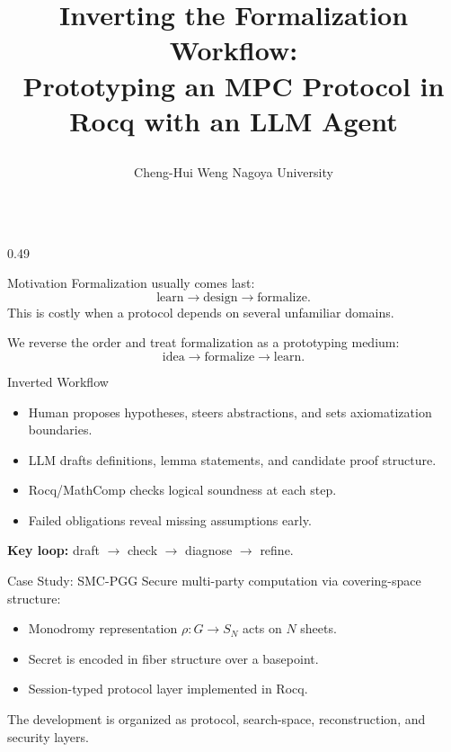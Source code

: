 \documentclass[final,t]{beamer}
\title{\parbox{0.93\linewidth}{\centering
Inverting the Formalization Workflow:\\[0.2em]
\Large Prototyping an MPC Protocol in Rocq with an LLM Agent}}
\author{Cheng-Hui Weng \quad Nagoya University}
\date{}
\newcommand{\kw}[1]{\textbf{#1}}
\begin{document}
\begin{frame}[t]
\vspace{-0.5em}
\begin{columns}[t,totalwidth=\linewidth]
  \begin{column}{0.49\linewidth}
    \begin{block}{Motivation}
      Formalization usually comes last:
      \[
      \text{learn} \to \text{design} \to \text{formalize}.
      \]
      This is costly when a protocol depends on several unfamiliar domains.

      \vspace{0.4em}
      We reverse the order and treat formalization as a prototyping medium:
      \[
      \text{idea} \to \text{formalize} \to \text{learn}.
      \]
    \end{block}

    \begin{block}{Inverted Workflow}
      \begin{itemize}
        \item Human proposes hypotheses, steers abstractions, and sets axiomatization boundaries.
        \item LLM drafts definitions, lemma statements, and candidate proof structure.
        \item Rocq/MathComp checks logical soundness at each step.
        \item Failed obligations reveal missing assumptions early.
      \end{itemize}
      \vspace{0.3em}
      \kw{Key loop:} draft $\to$ check $\to$ diagnose $\to$ refine.
    \end{block}

    \begin{block}{Case Study: SMC-PGG}
      Secure multi-party computation via covering-space structure:
      \begin{itemize}
        \item Monodromy representation \(\rho : G \to S_N\) acts on \(N\) sheets.
        \item Secret is encoded in fiber structure over a basepoint.
        \item Session-typed protocol layer implemented in Rocq.
      \end{itemize}
      The development is organized as protocol, search-space, reconstruction, and security layers.
    \end{block}
  \end{column}


\end{columns}
\end{frame}
\end{document}
